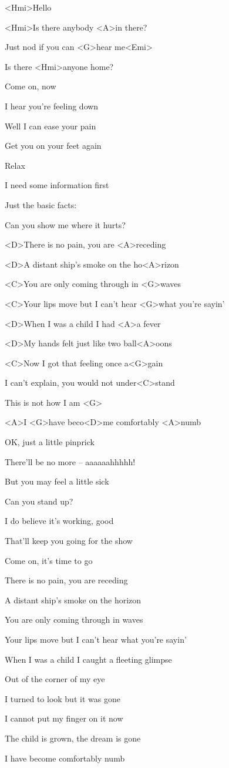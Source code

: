 
\zs
<Hmi>Hello

<Hmi>Is there anybody <A>in there?

Just nod if you can <G>hear me<Emi>

Is there <Hmi>anyone home?
\ks

\zs
Come on, now

I hear you’re feeling down

Well I can ease your pain

Get you on your feet again
\ks

\zs
Relax

I need some information first

Just the basic facts:

Can you show me where it hurts?
\ks

\zr
<D>There is no pain, you are <A>receding

<D>A distant ship’s smoke on the ho<A>rizon

<C>You are only coming through in <G>waves

<C>Your lips move but I can’t hear <G>what you’re sayin’

<D>When I was a child I had <A>a fever

<D>My hands felt just like two ball<A>oons

<C>Now I got that feeling once a<G>gain

I can’t explain, you would not under<C>stand

This is not how I am <G>

<A>I <G>have beco<D>me comfortably <A>numb
\kr

\zs
OK,
just a little pinprick

There’ll be no more -- aaaaaahhhhh!

But you may feel a little sick
\ks

\zs
Can you stand up?

I do believe it’s working, good

That’ll keep you going for the show

Come on, it’s time to go
\ks

\zr
There is no pain, you are receding

A distant ship’s smoke on the horizon

You are only coming through in waves

Your lips move but I can’t hear what you’re sayin’

When I was a child I caught a fleeting glimpse

Out of the corner of my eye

I turned to look but it was gone

I cannot put my finger on it now

The child is grown, the dream is gone

I have become comfortably numb
\kr
\kp
